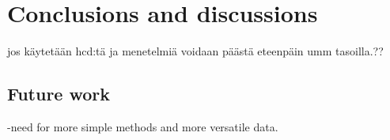 \documentclass[12pt,a4paper,oneside,pdftex]{report}
\begin{document}




% 


% 










% 

\chapter{Conclusions and discussions}
\label{chapter:conclusion}

jos käytetään hcd:tä ja menetelmiä voidaan päästä eteenpäin umm tasoilla.??
        \section{Future work}
	\label{sec:future}
	-need for more simple methods and more versatile data.
\end{document}

